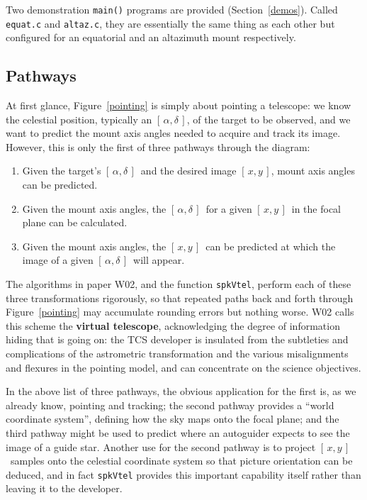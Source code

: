 \documentclass[11pt,fleqn,twoside,\paper]{article}
\renewcommand{\_}{{\tt\char'137}}     %
\newcommand{\radec}     {$[\,\alpha,\delta\,]$}
\newcommand{\xy}        {$[\,x,y\,]$}
\begin{document}
Two demonstration {\tt main()} programs are provided
(Section~\ref{demos}).
Called {\tt equat.c} and {\tt altaz.c}, they are essentially
the same thing as each other but configured
for an equatorial and an altazimuth mount respectively.

\subsection{Pathways}
\label{paths}

At first glance, Figure~\ref{pointing} is simply about pointing
a telescope:  we know the celestial position,
typically an \radec, of the target to be observed,
and we want to predict the mount axis angles
needed to acquire and track its image.  However, this is
only the first of three pathways through the diagram:
\begin{enumerate}
\item Given the target's \radec\ and the desired image \xy,
      mount axis angles can be predicted.
\item Given the mount axis angles, the \radec\ for a given \xy\ in
      the focal plane can be calculated.
\item Given the mount axis angles, the \xy\ can be predicted at which
      the image of a given \radec\ will appear.
\end{enumerate}
The algorithms in paper W02, and the function {\tt spkVtel},
perform each of these three transformations rigorously, so that
repeated paths back and forth through Figure~\ref{pointing} may
accumulate rounding errors but nothing worse.  W02 calls this
scheme the {\bf virtual telescope}, acknowledging the degree of
information hiding that is going on:  the TCS developer is
insulated from the subtleties and complications of the astrometric
transformation and the various misalignments and flexures in
the pointing model, and can concentrate on the science
objectives.

In the above list of three pathways, the obvious application for
the first is, as we already know, pointing and tracking;
the second pathway provides a ``world coordinate system'',
defining how the sky maps onto the focal plane; and
the third pathway might be used to predict
where an autoguider expects to see the image of a guide star.  Another
use for the second pathway is to project \xy\ samples onto the celestial
coordinate system so that picture orientation can be deduced, and in
fact {\tt spkVtel} provides this important capability itself rather
than leaving it to the developer.
\end{document}
